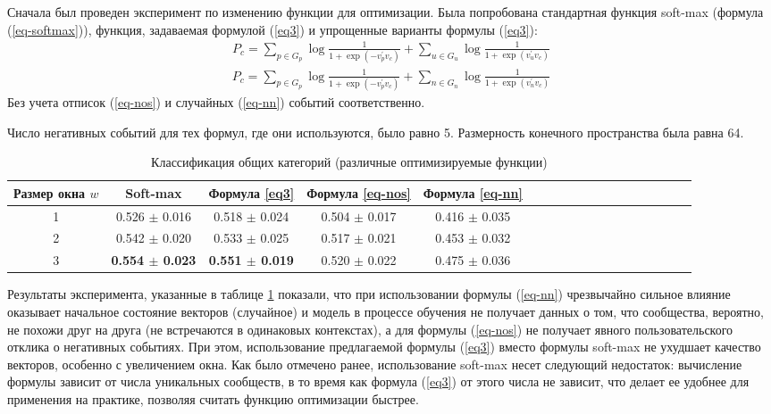 \documentclass[times,specification,annotation]{itmo-student-thesis}
\begin{document}
Сначала был проведен эксперимент по изменению функции для оптимизации. Была попробована стандартная функция soft-max (формула (\ref{eq-softmax})), функция, задаваемая формулой  (\ref{eq3}) и упрощенные варианты формулы  (\ref{eq3}):
\begin{align}
P_c = \sum_{p \in G_p} \log \frac{1}{1 + \exp(-v_p^{'}v_c)} + \sum_{u \in G_u} \log \frac{1}{1 + \exp(v_u^{'}v_c)} \label{eq-nos}
\end{align}
\begin{align}
P_c = \sum_{p \in G_p} \log \frac{1}{1 + \exp(-v_p^{'}v_c)} + \sum_{n \in G_n} \log \frac{1}{1 + \exp(v_n^{'}v_c)} \label{eq-nn}
\end{align}
Без учета отписок (\ref{eq-nos}) и случайных (\ref{eq-nn}) событий соответственно.

Число негативных событий для тех формул, где они используются, было равно 5. Размерность конечного пространства была равна 64.

\begin{table}[!h]
\caption{Классификация общих категорий (различные оптимизируемые функции)}\label{tab-cmp-f}
\centering
\begin{tabular}{|*{18}{c|}}\hline
Размер окна $w$ & Soft-max  & Формула \ref{eq3} & Формула \ref{eq-nos} & Формула \ref{eq-nn}   \\\hline
1    & 0.526 $\pm$ 0.016 & 0.518 $\pm$ 0.024 & 0.504 $\pm$ 0.017 & 0.416 $\pm$ 0.035 \\\hline
2    & 0.542 $\pm$ 0.020 & 0.533 $\pm$ 0.025 & 0.517 $\pm$ 0.021 & 0.453 $\pm$ 0.032 \\\hline
3    & \textbf{0.554 $\pm$ 0.023} & \textbf{0.551 $\pm$ 0.019} & 0.520 $\pm$ 0.022 & 0.475 $\pm$ 0.036 \\\hline
\end{tabular}
\end{table}

Результаты эксперимента, указанные в таблице \ref{tab-cmp-f} показали, что при использовании формулы (\ref{eq-nn}) чрезвычайно сильное влияние оказывает начальное состояние векторов (случайное) и модель в процессе обучения не получает данных о том, что сообщества, вероятно, не похожи друг на друга (не встречаются в одинаковых контекстах), а для формулы (\ref{eq-nos}) не получает явного пользовательского отклика о негативных событиях. При этом, использование предлагаемой формулы (\ref{eq3}) вместо формулы soft-max не ухудшает качество векторов, особенно с увеличением окна. Как было отмечено ранее, использование soft-max несет следующий недостаток: вычисление формулы зависит от числа уникальных сообществ, в то время как формула (\ref{eq3}) от этого числа не зависит, что делает ее удобнее для применения на практике, позволяя считать функцию оптимизации быстрее.
\end{document}
